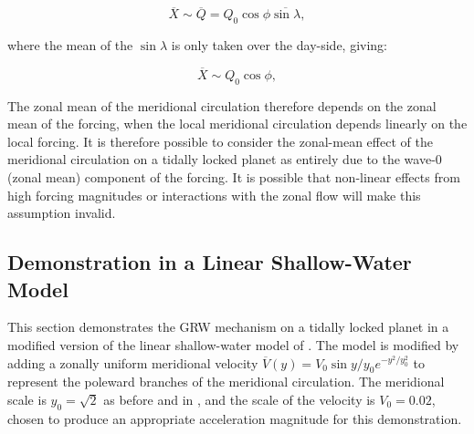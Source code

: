 \begin{equation}
  \overline{X} \sim \overline{Q} =Q_{0}\cos{\phi}\overline{\sin\lambda},
\end{equation}

where the mean of the $\sin \lambda$ is only taken over the day-side, giving:

\begin{equation}
  \overline{X} \sim Q_{0}\cos{\phi},
\end{equation}

The zonal mean of the meridional circulation therefore depends on the zonal mean of the forcing, when the local meridional circulation depends linearly on the local forcing. It is therefore possible to consider the zonal-mean effect of the meridional circulation on a tidally locked planet as entirely due to the wave-0 (zonal mean) component of the forcing. It is possible that non-linear effects from high forcing magnitudes or interactions with the zonal flow will make this assumption invalid.




\subsection{Demonstration in a Linear Shallow-Water Model}\label{sec:lin-sw-grw-results}

This section demonstrates the GRW mechanism on a tidally locked planet in a modified version of the linear shallow-water model of \citet{showman2011superrotation}. The model is modified by adding a zonally uniform meridional velocity $\overline{V}(y) = V_{0} \sin{y/y_{0}} e^{-y^{2}/y_{0}^{2}}$ to represent the poleward branches of the meridional circulation. The meridional scale is $y_{0}=\sqrt{2}$ as before and in \citet{matsuno1966quasi}, and the scale of the velocity is $V_{0} = 0.02$, chosen to produce an appropriate acceleration magnitude for this demonstration.





